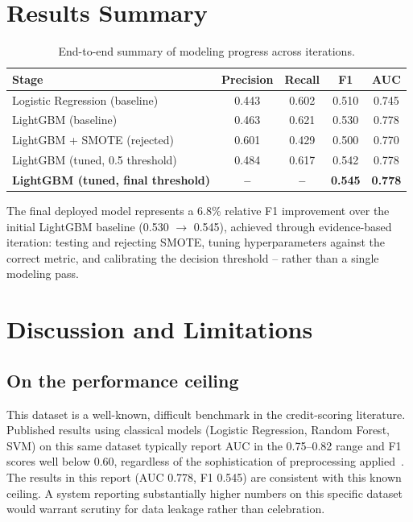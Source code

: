\documentclass[11pt]{article}
\begin{document}
\section{Results Summary}

\begin{table}[H]
\centering
\caption{End-to-end summary of modeling progress across iterations.}
\label{tab:summary}
\begin{tabular}{lcccc}
\toprule
\textbf{Stage} & \textbf{Precision} & \textbf{Recall} & \textbf{F1} & \textbf{AUC} \\
\midrule
Logistic Regression (baseline)     & 0.443 & 0.602 & 0.510 & 0.745 \\
LightGBM (baseline)                & 0.463 & 0.621 & 0.530 & 0.778 \\
LightGBM + SMOTE (rejected)        & 0.601 & 0.429 & 0.500 & 0.770 \\
LightGBM (tuned, 0.5 threshold)    & 0.484 & 0.617 & 0.542 & 0.778 \\
\textbf{LightGBM (tuned, final threshold)} & \textbf{--} & \textbf{--} & \textbf{0.545} & \textbf{0.778} \\
\bottomrule
\end{tabular}
\end{table}

The final deployed model represents a 6.8\% relative F1 improvement over
the initial LightGBM baseline (0.530 $\rightarrow$ 0.545), achieved
through evidence-based iteration: testing and rejecting SMOTE, tuning
hyperparameters against the correct metric, and calibrating the decision
threshold -- rather than a single modeling pass.

\section{Discussion and Limitations}

\subsection{On the performance ceiling}
This dataset is a well-known, difficult benchmark in the credit-scoring
literature. Published results using classical models (Logistic Regression,
Random Forest, SVM) on this same dataset typically report AUC in the
0.75--0.82 range and F1 scores well below 0.60, regardless of the
sophistication of preprocessing applied~\cite{yeh2009}. The results in this
report (AUC 0.778, F1 0.545) are consistent with this known ceiling. A
system reporting substantially higher numbers on this specific dataset
would warrant scrutiny for data leakage rather than celebration.
\end{document}
